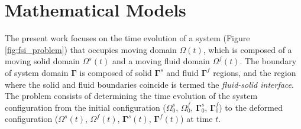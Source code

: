 \documentclass[sn-mathphys,Numbered]{sn-jnl}%
\newcommand{\bb}{\boldsymbol}
\begin{document}
\section{Mathematical Models}\label{sec:math_model}
The present work focuses on the time evolution of a system (Figure \ref{fig:fsi_problem}) that occupies moving domain $\Omega(t)$, which is composed of a moving solid domain $\Omega^s(t)$ and a moving fluid domain $\Omega^f(t)$.
The boundary of system domain $\bb{\Gamma}$ is composed of solid $\bb{\Gamma}^s$ and fluid $\bb{\Gamma}^f$ regions, and the region where the solid and fluid boundaries coincide is termed the \emph{fluid-solid interface}.
The problem consists of determining the time evolution of the system configuration from the initial configuration ($\Omega^s_0$, $\Omega^f_0$, $\bb{\Gamma}^s_0$, $\bb{\Gamma}^f_0$) to the deformed configuration ($\Omega^s(t)$, $\Omega^f(t)$, $\bb{\Gamma}^s(t)$, $\bb{\Gamma}^f(t)$) at time $t$.
\end{document}
